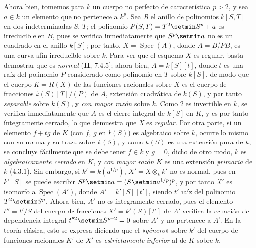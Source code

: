 \begin{remarks}[6.7.5]
\begin{enumerate}
Ahora bien, tomemos para $k$ un cuerpo no perfecto de característica $p>2$, y
sea $a\in k$ un elemento que no pertenece a $k^p$. Sea
$B$ el anillo de polinomios $k[S,T]$ en dos indeterminadas $S$, $T$; el
polinomio
$P(S,T)=T^2\setmin S^p+a$
es irreducible en $B$, pues se verifica inmediatamente que $S^p\setmin a$ no es
un cuadrado en el anillo $k[S]$; por tanto, $X=\operatorname{Spec}(A)$, donde $A=B/PB$,
es una curva afín irreducible sobre $k$. Para ver que el esquema $X$
es regular, basta demostrar que es \emph{normal} (\textbf{II}, 7.4.5); ahora bien,
$A=k[S][t]$, donde $t$ es una raíz del polinomio $P$ considerado como
polinomio en $T$ sobre $k[S]$, de modo que el cuerpo $K=R(X)$ de las funciones
racionales sobre $X$ es el cuerpo de fracciones $k(S)[T]/(P)$ de $A$,
extensión cuadrática de $k(S)$, y por tanto \emph{separable} sobre $k(S)$, y \emph{con mayor
razón} sobre $k$. Como $2$ es invertible en $k$, se verifica inmediatamente que $A$
es el cierre integral de $k[S]$ en $K$, y es por tanto íntegramente cerrado,
lo que demuestra que $X$ es \emph{regular}. Por otra parte, si un elemento $f+tg$
de $K$ (con $f$, $g$ en $k(S)$) es algebraico sobre $k$, ocurre lo mismo con
su norma y su traza sobre $k(S)$, y como $k(S)$ es una extensión pura
de $k$, se concluye fácilmente que se debe tener $f\in k$ y $g=0$,
dicho de otro modo, $k$ es \emph{algebraicamente cerrado} en $K$, y \emph{con mayor razón} $K$
es una extensión \emph{primaria}
de $k$ (4.3.1). Sin embargo, si
$k'=k(a^{1/p})$, $X'=X\otimes_k k'$ no es normal, pues en $k'[S]$
se puede escribir $S^p\setmin a=(S\setmin a^{1/p})^p$, y por tanto $X'$ es isomorfo a
$\operatorname{Spec}(A')$, donde $A'=k'[S][t']$, siendo $t'$ raíz del
polinomio $T^2\setmin S^p$. Ahora bien, $A'$ no es íntegramente cerrado, pues el elemento
$t''=t'/S$ del cuerpo de fracciones $K'=k'(S)[t']$ de $A'$ verifica
la ecuación de dependencia integral $t''^2\setmin S^{p-2}=0$ sobre $A'$ y
no pertenece a $A'$. En la teoría clásica, esto se expresa diciendo que el
«\emph{género}» sobre $k'$ del cuerpo de funciones racionales $K'$ de
$X'$ es \emph{estrictamente inferior} al de $K$ sobre $k$.


\end{enumerate}
\end{remarks}
